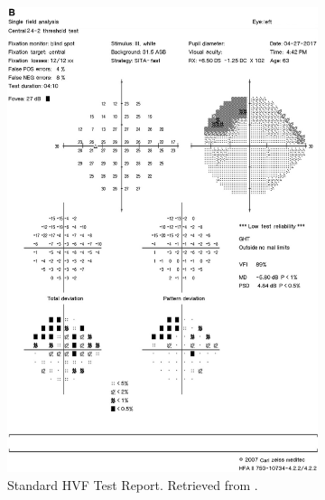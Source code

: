 \documentclass{l4proj}
\begin{document}
\newpage \begin{figure}[htbp]
    \centering
    \begin{subfigure}[b]{0.49\textwidth}
        \includegraphics[width=\textwidth]{dissertation/images/HVF-Report-Full.png}
        \caption{Standard HVF Test Report. Retrieved from \citet{Vercio2019}.}
        \label{fig:HVF_REPORT}
    \end{subfigure}
    ~
    \begin{subfigure}[b]{0.49\textwidth}

\end{subfigure}
\end{figure}
\end{document}
